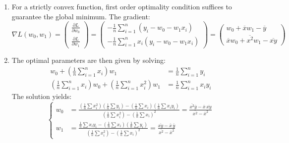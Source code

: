 \documentclass[a4paper, 10pt]{article}
\begin{document}
\begin{enumerate}[label=(\alph*)]
    \item For a strictly convex function, first order optimality condition suffices to guarantee the global minimum. The gradient:
    \begin{equation}
        \nabla L(w_0, w_1) = \begin{pmatrix}
            \frac{\partial L}{\partial w_0} \\ \frac{\partial L}{\partial w_1}
        \end{pmatrix} = 
        \begin{pmatrix}
            -\frac{1}{n}\sum_{i=1}^n(y_i - w_0 - w_1 x_i) \\ 
            -\frac{1}{n}\sum_{i=1}^n x_i(y_i - w_0 - w_1x_i)
        \end{pmatrix} = 
        \begin{pmatrix}
            w_0 + \overline{x} w_1 - \overline{y} \\ 
            \overline{x} w_0 + \overline{x^2} w_1 - \overline{xy}
        \end{pmatrix}
    \end{equation}
    
    \item The optimal parameters are then given by solving:
    \begin{equation}
        \begin{aligned}
            w_0 + \left(\frac{1}{n}\sum_{i=1}^n x_i\right) w_1 &= \frac{1}{n}\sum_{i=1}^n y_i \\ 
            \left(\frac{1}{n}\sum_{i=1}^n x_i\right) w_0 + \left(\frac{1}{n}\sum_{i=1}^n x_i^2\right) w_1 &= \frac{1}{n}\sum_{i=1}^n x_iy_i
        \end{aligned}
    \end{equation}
    The solution yields:
    \begin{equation}
        \left\{\begin{aligned}
            w_0 &= \frac{\left(\frac{1}{n}\sum x_i^2\right)\left(\frac{1}{n}\sum y_i\right) - \left(\frac{1}{n}\sum x_i\right)\left(\frac{1}{n}\sum x_iy_i\right)}{\left(\frac{1}{n}\sum x_i^2\right) - \left(\frac{1}{n}\sum x_i\right)^2} = \frac{\overline{x^2}\overline{y} - \overline{x}\,\overline{xy}}{\overline{x^2} - \overline{x}^2}\\
            w_1 &= \frac{\frac{1}{n}\sum x_iy_i - \left(\frac{1}{n}\sum x_i\right)\left(\frac{1}{n}\sum y_i\right)}{\left(\frac{1}{n}\sum x_i^2\right) - \left(\frac{1}{n}\sum x_i\right)^2} = \frac{\overline{xy} - \overline{x}\,\overline{y}}{\overline{x^2} - \overline{x}^2}
        \end{aligned}\right.
    \end{equation}
    
\end{enumerate}
\end{document}
